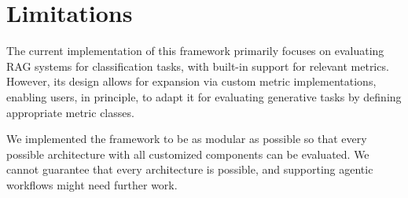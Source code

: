 \section{Limitations}

The current implementation of this framework primarily focuses on evaluating RAG systems for classification tasks, with built-in support for relevant metrics. However, its design allows for expansion via custom metric implementations, enabling users, in principle, to adapt it for evaluating generative tasks by defining appropriate metric classes.

We implemented the framework to be as modular as possible so that every possible architecture with all customized components can be evaluated. We cannot guarantee that every architecture is possible, and supporting agentic workflows might need further work.




